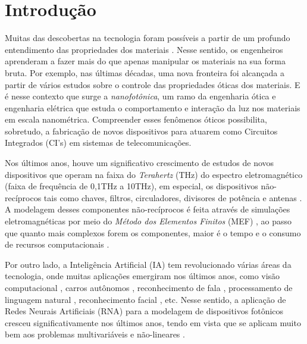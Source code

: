 \chapter{Introdução}      \label{Introducao}

Muitas das descobertas na tecnologia foram possíveis a partir de um profundo entendimento das propriedades dos materiais \cite{Joannopoulos:08:Book}. Nesse sentido, os engenheiros aprenderam a fazer mais do que apenas manipular os materiais na sua forma bruta. Por exemplo, nas últimas décadas, uma nova fronteira foi alcançada a partir de vários estudos sobre o controle das propriedades óticas dos materiais. E é nesse contexto que surge a \textit{nanofotônica}, um ramo da engenharia ótica e engenharia elétrica que estuda o comportamento e interação da luz nos materiais em escala nanométrica. Compreender esses fenômenos óticos possibilita, sobretudo, a fabricação de novos dispositivos para atuarem como Circuitos Integrados (CI's) em sistemas de telecomunicações.

Nos últimos anos, houve um significativo crescimento de estudos de novos dispositivos que operam na faixa do \textit{Terahertz} (THz) do espectro eletromagnético (faixa de frequência de 0,1THz a 10THz), em especial, os dispositivos não-recíprocos tais como chaves, filtros, circuladores, divisores de potência e antenas \cite{dmitriev2012nonreciprocal,dmitriev2013optical,dmitriev2019dynamically}. A modelagem desses componentes não-recíprocos é feita através de simulações eletromagnéticas por meio do \textit{Método dos Elementos Finitos} (MEF) \cite{zienkiewicz1977finite}, ao passo que quanto mais complexos forem os componentes, maior é o tempo e o consumo de recursos computacionais \cite{noureen2021deep,valkanas2019neural}.

Por outro lado, a Inteligência Artificial (IA) tem revolucionado várias áreas da tecnologia, onde muitas aplicações emergiram nos últimos anos, como visão computacional \cite{krizhevsky2012imagenet}, carros autônomos \cite{al2017deep}, reconhecimento de fala \cite{hinton2012deep}, processamento de linguagem natural \cite{socher2013recursive}, reconhecimento facial \cite{taigman2014deepface}, etc. Nesse sentido, a aplicação de Redes Neurais Artificiais (RNA) para a modelagem de dispositivos fotônicos cresceu significativamente nos últimos anos, tendo em vista que se aplicam muito bem aos problemas multivariáveis e não-lineares \cite{noureen2021deep,malkiel2017deep,liu2018training,Kojima2020sep}.

